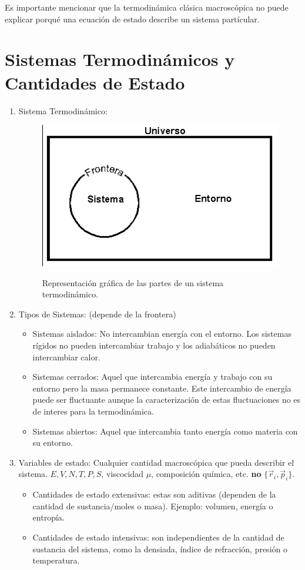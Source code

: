 Es importante mencionar que la termodinámica clásica macroscópica no puede explicar porqué una ecuación de estado describe un sistema partícular.

\newpage

\section{Sistemas Termodinámicos y Cantidades de Estado}

\begin{enumerate}
	\item Sistema Termodinámico:
	\begin{figure}[H]
		\centering
		\includegraphics[scale=0.3]{./img/thermodynamicSystem.png}
		\label{thermodynamicSystem}
		\caption{Representación gráfica de las partes de un sistema termodinámico.}
	\end{figure}
	
	\item Tipos de Sistemas: (depende de la frontera)
	\begin{itemize}
		\item Sistemas aislados: No intercambian energía con el entorno. Los sistemas rígidos no pueden intercambiar trabajo y los adiabáticos no pueden intercambiar calor.
		\item Sistemas cerrados: Aquel que intercambia energía y trabajo con su entorno pero la masa permanece constante. Este intercambio de energía puede ser fluctuante aunque la caracterización de estas fluctuaciones no es de interes para la termodinámica.
		\item Sistemas abiertos: Aquel que intercambia tanto energía como materia con su entorno.
	\end{itemize}
	\item Variables de estado: Cualquier cantidad macroscópica que pueda describir el sistema. $E,V,N,T,P,S$, viscocidad $\mu$, composición química, etc. \textbf{no} $\{ \vec{r}_i , \vec{p} _i \}$. 
	\begin{itemize}
		\item Cantidades de estado extensivas: estas son aditivas (dependen de la cantidad de sustancia/moles o masa). Ejemplo: volumen, energía o entropía.
		\item Cantidades de estado intensivas: son independientes de la cantidad de sustancia del sistema, como la densiada, índice de refracción, presión o temperatura.
	\end{itemize}
\end{enumerate}



